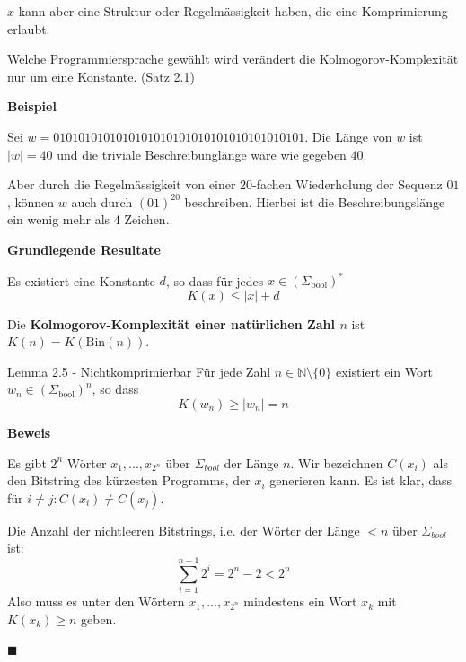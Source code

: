 \documentclass[a4paper, 11pt]{article}
\def\N{\mathbb{N}}
\begin{document}
        $x$ kann aber eine Struktur oder Regelmässigkeit haben, die eine Komprimierung erlaubt.
    
        Welche Programmiersprache gewählt wird verändert die Kolmogorov-Komplexität nur um eine Konstante. (Satz 2.1)
    
    
    
        \textbf{Beispiel}
        
        Sei $w = 0101010101010101010101010101010101010101$. Die Länge von $w$ ist $|w| = 40$ und die triviale Beschreibunglänge wäre wie gegeben $40$.
    
        Aber durch die Regelmässigkeit von einer $20$-fachen Wiederholung der Sequenz $01$, können $w$ auch durch $(01)^{20}$ beschreiben. 
        Hierbei ist die Beschreibungslänge ein wenig mehr als $4$ Zeichen.
    
    
    
        \textbf{Grundlegende Resultate}
        \begin{mainbox}{}
            Es existiert eine Konstante $d$, so dass für jedes $x \in (\Sigma_{\text{bool}})^*$
            $$K(x) \leq |x| + d$$
        \end{mainbox}
    
        \begin{mainbox}{}
            Die \textbf{Kolmogorov-Komplexität einer natürlichen Zahl $n$} ist $K(n) = K(\text{Bin}(n))$.
        \end{mainbox}
    
        
        \begin{mainbox}{Lemma 2.5 - Nichtkomprimierbar}
            Für jede Zahl $n \in \N \setminus\{0\}$ existiert ein Wort $w_n \in (\Sigma_{\text{bool}})^n$, so dass 
            $$K(w_n) \geq |w_n| = n$$
        \end{mainbox}
        \textbf{Beweis}

        Es gibt $2^n$ Wörter $x_1, ..., x_{2^n}$ über $\Sigma_{bool}$ der Länge $n$. 
        Wir bezeichnen $C(x_i)$ als den Bitstring des kürzesten Programms, der $x_i$ generieren kann. Es ist klar, dass für $i \neq j: C(x_i) \neq C(x_j)$.
    
        Die Anzahl der nichtleeren Bitstrings, i.e. der Wörter der Länge $< n$ über $\Sigma_{bool}$ ist:
        $$\sum_{i = 1}^{n-1} 2^i = 2^n - 2 < 2^n$$
        Also muss es unter den Wörtern $x_1, ...,x_{2^n}$ mindestens ein Wort $x_k$ mit $K(x_k) \geq n$ geben.
        
        \hspace*{0pt}\hfill$\blacksquare$
    
\end{document}
